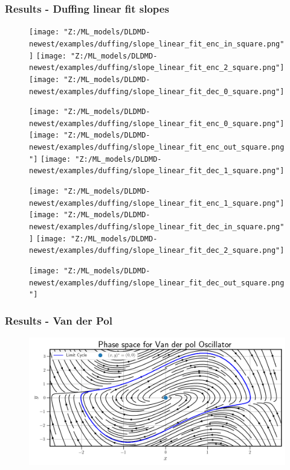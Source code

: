 \documentclass[11pt,aspectratio=169]{beamer}
\begin{document}
    \begin{frame}
        \frametitle{Results - Duffing linear fit slopes}
        \begin{figure}
            \centering
            \begin{minipage}{.3333\textwidth}
                \texttt{[image: "Z:/ML\_models/DLDMD-newest/examples/duffing/slope\_linear\_fit\_enc\_in\_square.png"]}
                \texttt{[image: "Z:/ML\_models/DLDMD-newest/examples/duffing/slope\_linear\_fit\_enc\_2\_square.png"]}
                \texttt{[image: "Z:/ML\_models/DLDMD-newest/examples/duffing/slope\_linear\_fit\_dec\_0\_square.png"]}
            \end{minipage}%
            \begin{minipage}{.3333\textwidth}
                \texttt{[image: "Z:/ML\_models/DLDMD-newest/examples/duffing/slope\_linear\_fit\_enc\_0\_square.png"]}
                \texttt{[image: "Z:/ML\_models/DLDMD-newest/examples/duffing/slope\_linear\_fit\_enc\_out\_square.png"]}
                \texttt{[image: "Z:/ML\_models/DLDMD-newest/examples/duffing/slope\_linear\_fit\_dec\_1\_square.png"]}
            \end{minipage}%
            \begin{minipage}{.3333\textwidth}
                \texttt{[image: "Z:/ML\_models/DLDMD-newest/examples/duffing/slope\_linear\_fit\_enc\_1\_square.png"]}
                \texttt{[image: "Z:/ML\_models/DLDMD-newest/examples/duffing/slope\_linear\_fit\_dec\_in\_square.png"]}
                \texttt{[image: "Z:/ML\_models/DLDMD-newest/examples/duffing/slope\_linear\_fit\_dec\_2\_square.png"]}
            \end{minipage}
            \texttt{[image: "Z:/ML\_models/DLDMD-newest/examples/duffing/slope\_linear\_fit\_dec\_out\_square.png"]}
        \end{figure}
    \end{frame}



    \begin{frame}
        \frametitle{Results - Van der Pol}
        \begin{figure}
            \centering
            \includegraphics[width=\textwidth]{../Figures/van_der_pol_phase_space.png}
        \end{figure}
    \end{frame}
\end{document}
